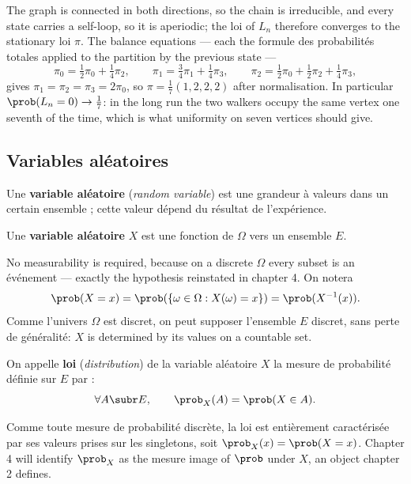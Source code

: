 \begin{example}
  The graph is connected in both directions, so the chain is irreducible, and
  every state carries a self-loop, so it is aperiodic; the loi of $L_{n}$
  therefore converges to the stationary loi $\pi$. The balance equations ---
  each the formule des probabilités totales applied to the partition by the
  previous state ---
  \[ \pi_{0} = \tfrac12 \pi_{0} + \tfrac14 \pi_{2}, \qquad
     \pi_{1} = \tfrac34 \pi_{1} + \tfrac14 \pi_{3}, \qquad
     \pi_{2} = \tfrac12 \pi_{0} + \tfrac12 \pi_{2} + \tfrac14 \pi_{3}, \]
  gives $\pi_{1} = \pi_{2} = \pi_{3} = 2\pi_{0}$, so
  $\pi = \tfrac17 (1,2,2,2)$ after normalisation. In particular
  $\prob(L_{n} = 0) \to \tfrac17$: in the long run the two walkers occupy the
  same vertex one seventh of the time, which is what uniformity on seven
  vertices should give.
\end{example}

\subsection{Variables aléatoires}

Une \textbf{variable aléatoire} (\textit{random variable}) est une grandeur à
valeurs dans un certain ensemble ; cette valeur dépend du résultat de
l'expérience.

\begin{definition}
  Une \textbf{variable aléatoire} $X$ est une fonction de $\Omega$ vers un
  ensemble $E$.
\end{definition}

No measurability is required, because on a discrete $\Omega$ every subset is an
événement --- exactly the hypothesis reinstated in chapter 4. On notera
\[ \prob(X = x) = \prob(\{\omega \in \Omega : X(\omega) = x\})
                = \prob(X^{-1}(x)). \]
Comme l'univers $\Omega$ est discret, on peut supposer l'ensemble $E$ discret,
sans perte de généralité: $X$ is determined by its values on a countable set.

\begin{definition}
  On appelle \textbf{loi} (\textit{distribution}) de la variable aléatoire $X$ la
  mesure de probabilité définie sur $E$ par :
  \[ \forall A \subr E, \qquad \prob_{X}(A) = \prob(X \in A). \]
\end{definition}

Comme toute mesure de probabilité discrète, la loi est entièrement caractérisée
par ses valeurs prises sur les singletons, soit $\prob_{X}(x) = \prob(X = x)$.
Chapter 4 will identify $\prob_{X}$ as the mesure image of $\prob$ under $X$, an
object chapter 2 defines.

